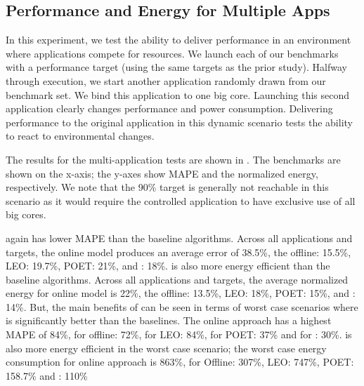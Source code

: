 

\subsection{Performance and Energy for Multiple Apps}
In this experiment, we test the ability to deliver performance in an
environment where applications compete for resources.  We launch each
of our benchmarks with a performance target (using the same targets as
the prior study).  Halfway through execution, we start another
application randomly drawn from our benchmark set.  We bind this
application to one big core.  Launching this second application
clearly changes performance and power consumption.  Delivering
performance to the original application in this dynamic scenario tests
the ability to react to environmental changes.

The results for the multi-application tests are shown in
.  The benchmarks are shown
on the x-axis; the y-axes show MAPE and the normalized energy,
respectively.  We note that the 90\% target is generally not reachable
in this scenario as it would require the controlled application to
have exclusive use of all big cores.


\SYSTEM{} again has lower MAPE than the baseline algorithms. Across
all applications and targets, the online model produces an average
error of 38.5\%, the offline: 15.5\%, LEO: 19.7\%, POET: 21\%, and
\SYSTEM{}: 18\%. \SYSTEM{} is also more energy efficient than the
baseline algorithms. Across all applications and targets, the average
normalized energy for online model is 22\%, the offline: 13.5\%, LEO:
18\%, POET: 15\%, and \SYSTEM{}: 14\%. But, the main benefits of
\SYSTEM{} can be seen in terms of worst case scenarios where \SYSTEM{}
is significantly better than the baselines. The online approach has a
highest MAPE of 84\%, for offline: 72\%, for LEO: 84\%, for POET: 37\%
and for \SYSTEM{}: 30\%. \SYSTEM{} is also more energy efficient in
the worst case scenario; the worst case energy consumption for online
approach is 863\%, for Offline: 307\%, LEO: 747\%, POET: 158.7\% and
\SYSTEM{}: 110\%


